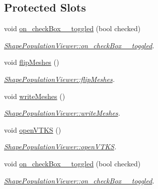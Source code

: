 \subsection*{Protected Slots}
\begin{DoxyCompactItemize}
\item 
void \hyperlink{class_shape_population_viewer_a91b876667179929c024a505a275783a6}{on\-\_\-check\-Box\-\_\-\_\-toggled} (bool checked)
\begin{DoxyCompactList}\small\item\em \hyperlink{class_shape_population_viewer_a91b876667179929c024a505a275783a6}{Shape\-Population\-Viewer\-::on\-\_\-check\-Box\-\_\-\_\-toggled}. \end{DoxyCompactList}\item 
void \hyperlink{class_shape_population_viewer_a272c7bf9b39d094ad66568000e8471c0}{flip\-Meshes} ()
\begin{DoxyCompactList}\small\item\em \hyperlink{class_shape_population_viewer_a272c7bf9b39d094ad66568000e8471c0}{Shape\-Population\-Viewer\-::flip\-Meshes}. \end{DoxyCompactList}\item 
void \hyperlink{class_shape_population_viewer_afa9af662d31268f494c205ab524e721c}{write\-Meshes} ()
\begin{DoxyCompactList}\small\item\em \hyperlink{class_shape_population_viewer_afa9af662d31268f494c205ab524e721c}{Shape\-Population\-Viewer\-::write\-Meshes}. \end{DoxyCompactList}\item 
void \hyperlink{class_shape_population_viewer_aa73417b59af3f879f79b42f2d2ca1e7f}{open\-V\-T\-K\-S} ()
\begin{DoxyCompactList}\small\item\em \hyperlink{class_shape_population_viewer_aa73417b59af3f879f79b42f2d2ca1e7f}{Shape\-Population\-Viewer\-::open\-V\-T\-K\-S}. \end{DoxyCompactList}\item 
void \hyperlink{class_shape_population_viewer_a962f1efd33b8d4fe3e28181a37d9aa30}{on\-\_\-check\-Box\-\_\-\_\-toggled} (bool checked)
\begin{DoxyCompactList}\small\item\em \hyperlink{class_shape_population_viewer_a962f1efd33b8d4fe3e28181a37d9aa30}{Shape\-Population\-Viewer\-::on\-\_\-check\-Box\-\_\-\_\-toggled}. \end{DoxyCompactList}\item 

\end{DoxyCompactItemize}
